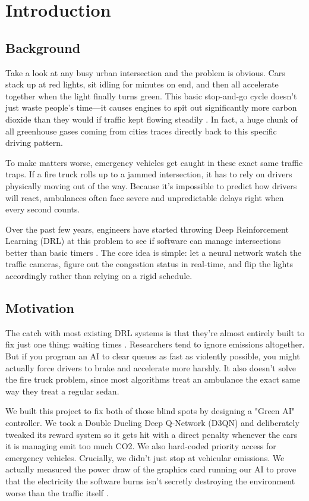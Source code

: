 \chapter{Introduction}
\label{chap:intro}

\section{Background}
Take a look at any busy urban intersection and the problem is obvious. Cars stack up at red lights, sit idling for minutes on end, and then all accelerate together when the light finally turns green. This basic stop-and-go cycle doesn't just waste people's time—it causes engines to spit out significantly more carbon dioxide than they would if traffic kept flowing steadily \cite{al2021deep}. In fact, a huge chunk of all greenhouse gases coming from cities traces directly back to this specific driving pattern.

To make matters worse, emergency vehicles get caught in these exact same traffic traps. If a fire truck rolls up to a jammed intersection, it has to rely on drivers physically moving out of the way. Because it's impossible to predict how drivers will react, ambulances often face severe and unpredictable delays right when every second counts. 

Over the past few years, engineers have started throwing Deep Reinforcement Learning (DRL) at this problem to see if software can manage intersections better than basic timers \cite{genders2016using}. The core idea is simple: let a neural network watch the traffic cameras, figure out the congestion status in real-time, and flip the lights accordingly rather than relying on a rigid schedule.

\section{Motivation}
The catch with most existing DRL systems is that they're almost entirely built to fix just one thing: waiting times \cite{chen2023adaptive}. Researchers tend to ignore emissions altogether. But if you program an AI to clear queues as fast as violently possible, you might actually force drivers to brake and accelerate more harshly. It also doesn't solve the fire truck problem, since most algorithms treat an ambulance the exact same way they treat a regular sedan.

We built this project to fix both of those blind spots by designing a "Green AI" controller. We took a Double Dueling Deep Q-Network (D3QN) and deliberately tweaked its reward system so it gets hit with a direct penalty whenever the cars it is managing emit too much CO2. We also hard-coded priority access for emergency vehicles. Crucially, we didn't just stop at vehicular emissions. We actually measured the power draw of the graphics card running our AI to prove that the electricity the software burns isn't secretly destroying the environment worse than the traffic itself \cite{schwartz2020green}.


